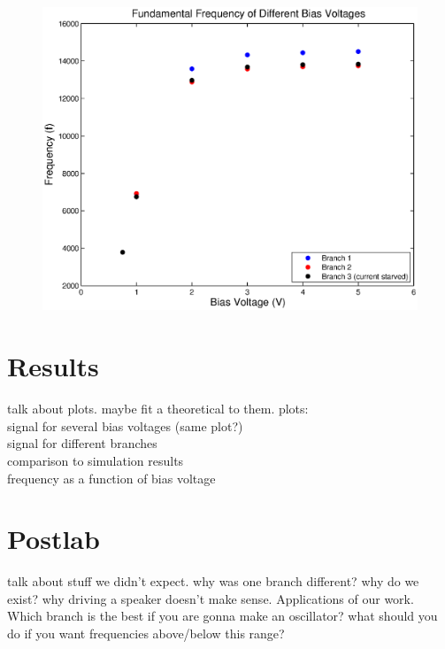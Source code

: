 \documentclass{article}
\begin{document}
\begin{figure}[H]
\centering
\includegraphics[scale=1]{biasFrequenciesSim.eps}
\caption{}
\label{biasFrequenciesSim}
\end{figure}

\section{Results}
talk about plots. maybe fit a theoretical to them.
plots:\\
signal for several bias voltages (same plot?)\\
signal for different branches\\
comparison to simulation results\\
frequency as a function of bias voltage\
\section{Postlab}
talk about stuff we didn't expect. why was one branch different? why do we exist? why driving a speaker doesn't make sense. Applications of our work. Which branch is the best if you are gonna make an oscillator? what should you do if you want frequencies above/below this range?

\end{document}
